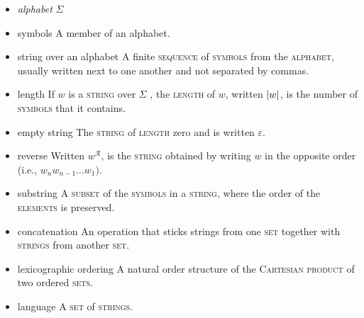 \documentclass{article}
\newcommand{\term}[1]{\textsc{#1}}
\begin{document}
\bigskip \indent
\begin{itemize}
\item \emph{alphabet} $\Sigma$

\item symbols
   \subitem A member of an alphabet.

\item string over an alphabet
   \subitem A finite \term{sequence} of \term{symbols} from the \term{alphabet}, usually written next to one another and not separated by commas.

\item length 
   \subitem If  $w$ is a \term{string} over  $\Sigma$ , the \term{length} of $w$, written $\abs{w}$, is the number of \term{symbols} that it contains.

\item empty string 
   \subitem The \term{string} of \term{length} zero and is written $\varepsilon$.

\item reverse
   \subitem Written $w^\mathcal{R}$, is the \term{string} obtained by writing $w$ in the opposite order (i.e., $w_{n}w_{n-1}...w_{1}).$

\item substring
   \subitem A \term{subset} of the \term{symbols} in a \term{string}, where the order of the \term{elements} is preserved.
   
\item concatenation
   \subitem An operation that sticks strings from one \term{set} together with \term{strings} from another \term{set}. 

\item lexicographic ordering
   \subitem A natural order structure of the \term{Cartesian product} of two ordered \term{sets}.

\item language
  \subitem A \term{set} of \term{strings}.

\end{itemize}
\end{document}

